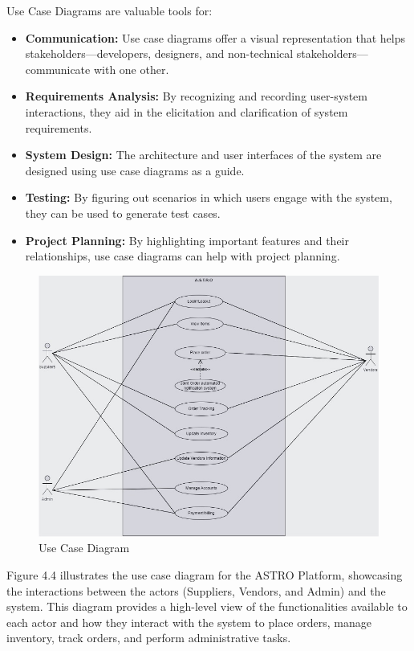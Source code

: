 Use Case Diagrams are valuable tools for:
\begin{itemize}
    \item \textbf{Communication:} Use case diagrams offer a visual representation that helps stakeholders—developers, designers, and non-technical stakeholders—communicate with one other.
    \item \textbf{Requirements Analysis:} By recognizing and recording user-system interactions, they aid in the elicitation and clarification of system requirements.
    \item \textbf{System Design:} The architecture and user interfaces of the system are designed using use case diagrams as a guide.
    \item \textbf{Testing:} By figuring out scenarios in which users engage with the system, they can be used to generate test cases.
    \item \textbf{Project Planning:} By highlighting important features and their relationships, use case diagrams can help with project planning.
\end{itemize}
\begin{figure}[H]
    \centering
    \includegraphics[width=1\textwidth]{Figures/Use case diagram.jpg}
    \caption{Use Case Diagram}
    \label{fig:use-case-diagram}
\end{figure}
\noindent Figure 4.4 illustrates the use case diagram for the ASTRO Platform, showcasing the interactions between the actors (Suppliers, Vendors, and Admin) and the system. This diagram provides a high-level view of the functionalities available to each actor and how they interact with the system to place orders, manage inventory, track orders, and perform administrative tasks.
